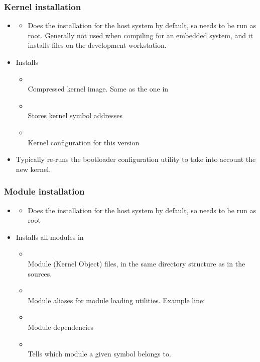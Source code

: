 \begin{frame}
  \frametitle{Kernel installation}
  \begin{itemize}
  \item {}
    \begin{itemize}
    \item Does the installation for the host system by default, so
      needs to be run as root. Generally not used when compiling for
      an embedded system, and it installs files on the development
      workstation.
    \end{itemize}
  \item Installs
    \begin{itemize}
    \item {} \\
      Compressed kernel image. Same as the one in
    \item {}\\
      Stores kernel symbol addresses
    \item {}\\
      Kernel configuration for this version
    \end{itemize}
  \item Typically re-runs the bootloader configuration utility to take
    into account the new kernel.
  \end{itemize}
\end{frame}

\begin{frame}
  \frametitle{Module installation}
  \begin{itemize}
  \item {}
    \begin{itemize}
    \item Does the installation for the host system by default, so
      needs to be run as root
    \end{itemize}
  \item Installs all modules in 
    \begin{itemize}
    \item {}\\
      Module  (Kernel Object) files, in the same directory
      structure as in the sources.
    \item {}\\
      Module aliases for module loading utilities. Example line:\\
    \item {}\\
      Module dependencies
    \item {}\\
      Tells which module a given symbol belongs to.
    \end{itemize}
  \end{itemize}
\end{frame}


